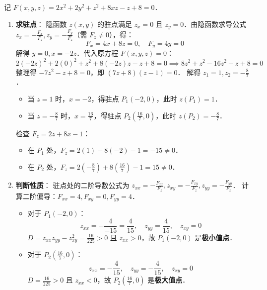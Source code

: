 \documentclass[12pt, a4paper, oneside, UTF8]{ctexbook}
\begin{document}
\begin{solution}
    记 $F(x,y,z) = 2x^2 + 2y^2 + z^2 + 8xz - z + 8 = 0$．
    
    \begin{enumerate}
        \item \textbf{求驻点}：
        隐函数 $z(x,y)$ 的驻点满足 $z_x = 0$ 且 $z_y = 0$．由隐函数求导公式 $z_x = -\frac{F_x}{F_z}, z_y = -\frac{F_y}{F_z}$（需 $F_z \neq 0$），得：
        \[ F_x = 4x + 8z = 0, \quad F_y = 4y = 0 \]
        解得 $y = 0, x = -2z$．代入原方程 $F(x,y,z) = 0$：
        \[ 2(-2z)^2 + 2(0)^2 + z^2 + 8(-2z)z - z + 8 = 0 \implies 8z^2 + z^2 - 16z^2 - z + 8 = 0 \]
        整理得 $-7z^2 - z + 8 = 0$，即 $(7z+8)(z-1) = 0$．
        解得 $z_1 = 1, z_2 = -\frac{8}{7}$．
        \begin{itemize}
            \item 当 $z = 1$ 时，$x = -2$，得驻点 $P_1(-2, 0)$，此时 $z(P_1) = 1$．
            \item 当 $z = -\frac{8}{7}$ 时，$x = \frac{16}{7}$，得驻点 $P_2(\frac{16}{7}, 0)$，此时 $z(P_2) = -\frac{8}{7}$．
        \end{itemize}
        
        检查 $F_z = 2z + 8x - 1$：
        \begin{itemize}
            \item 在 $P_1$ 处，$F_z = 2(1) + 8(-2) - 1 = -15 \neq 0$．
            \item 在 $P_2$ 处，$F_z = 2(-\frac{8}{7}) + 8(\frac{16}{7}) - 1 = 15 \neq 0$．
        \end{itemize}

        \item \textbf{判断性质}：
        驻点处的二阶导数公式为 $z_{xx} = -\frac{F_{xx}}{F_z}, z_{xy} = -\frac{F_{xy}}{F_z}, z_{yy} = -\frac{F_{yy}}{F_z}$．
        计算二阶偏导：$F_{xx} = 4, F_{xy} = 0, F_{yy} = 4$．
        \begin{itemize}
            \item 对于 $P_1(-2, 0)$：
            \[ z_{xx} = -\frac{4}{-15} = \frac{4}{15}, \quad z_{yy} = \frac{4}{15}, \quad z_{xy} = 0 \]
            $D = z_{xx}z_{yy} - z_{xy}^2 = \frac{16}{225} > 0$ 且 $z_{xx} > 0$，故 $P_1(-2, 0)$ 是\textbf{极小值点}．
            \item 对于 $P_2(\frac{16}{7}, 0)$：
            \[ z_{xx} = -\frac{4}{15}, \quad z_{yy} = -\frac{4}{15}, \quad z_{xy} = 0 \]
            $D = \frac{16}{225} > 0$ 且 $z_{xx} < 0$，故 $P_2(\frac{16}{7}, 0)$ 是\textbf{极大值点}．
        \end{itemize}
    \end{enumerate}
\end{solution}
\ifx\allfiles\undefined
\end{document}
